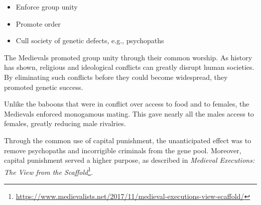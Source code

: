 \begin{itemize}


\item Enforce group unity

\item Promote order

\item Cull society of genetic defects, e.g., psychopaths
\end{itemize}


The Medievals promoted group unity through their common worship. As history has shown, religious and ideological conflicts can greatly disrupt human societies. By eliminating such conflicts before they could become widespread, they promoted genetic success.

Unlike the baboons that were in conflict over access to food and to females, the Medievals enforced monogamous mating. This gave nearly all the males access to females, greatly reducing male rivalries.

Through the common use of capital punishment, the unanticipated effect was to remove psychopaths and incorrigible criminals from the gene pool. Moreover, capital punishment served a higher purpose, as described in \textit{Medieval Executions: The View from the Scaffold}\footnote{\url{https://www.medievalists.net/2017/11/medieval-executions-view-scaffold/}}.


